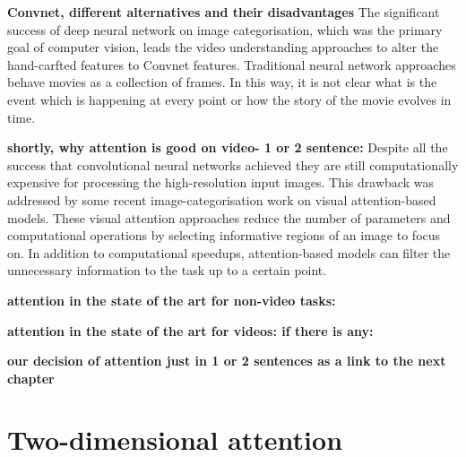 \documentclass{article} %
\begin{document}
\textbf{Convnet, different alternatives and their disadvantages} The significant success of deep neural network on image categorisation, which was the primary goal of computer vision, leads the video understanding approaches to alter the hand-carfted features to  Convnet features. Traditional neural network approaches behave movies as a collection of frames. In this way, it is not clear what is the event which is happening at every point or how the story of the movie evolves in time.

\textbf{shortly, why attention is good on video- 1 or 2 sentence:}
Despite all the success that convolutional neural networks achieved they are still computationally expensive for processing the high-resolution input images. This drawback was addressed by some recent image-categorisation work on visual attention-based models. These visual attention approaches reduce the number of parameters and computational operations by selecting informative regions of an image to focus on. In addition to computational speedups, attention-based models can filter the unnecessary information to the task up to a certain point.

\textbf{attention in the state of the art for non-video tasks:}

\textbf{attention in the state of the art for videos: if there is any:}

\textbf{our decision of attention just in 1 or 2 sentences as a link to the next chapter}

\section{Two-dimensional attention}
\end{document}
